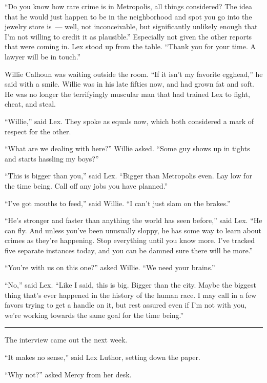 \documentclass[ebook,12pt]{memoir}
\begin{document}
``Do you know how rare crime is in Metropolis, all things considered?
The idea that he would just happen to be in the neighborhood and spot
you go into the jewelry store is~--- well, not inconceivable, but
significantly unlikely enough that I'm not willing to credit it as
plausible.'' Especially not given the other reports that were coming in.
Lex stood up from the table. ``Thank you for your time. A lawyer will be
in touch.''

Willie Calhoun was waiting outside the room. ``If it isn't my favorite
egghead,'' he said with a smile. Willie was in his late fifties now, and
had grown fat and soft. He was no longer the terrifyingly muscular man
that had trained Lex to fight, cheat, and steal.

``Willie,'' said Lex. They spoke as equals now, which both considered a
mark of respect for the other.

``What are we dealing with here?'' Willie asked. ``Some guy shows up in
tights and starts hassling my boys?''

``This is bigger than you,'' said Lex. ``Bigger than Metropolis even.
Lay low for the time being. Call off any jobs you have planned.''

``I've got mouths to feed,'' said Willie. ``I can't just slam on the
brakes.''

``He's stronger and faster than anything the world has seen before,''
said Lex. ``He can fly. And unless you've been unusually sloppy, he has
some way to learn about crimes as they're happening. Stop everything
until you know more. I've tracked five separate instances today, and you
can be damned sure there will be more.''

``You're with us on this one?'' asked Willie. ``We need your brains.''

``No,'' said Lex. ``Like I said, this is big. Bigger than the city.
Maybe the biggest thing that's ever happened in the history of the human
race. I may call in a few favors trying to get a handle on it, but rest
assured even if I'm not with you, we're working towards the same goal
for the time being.''

\begin{center}\rule{0.5\linewidth}{0.5pt}\end{center}

The interview came out the next week.

``It makes no sense,'' said Lex Luthor, setting down the paper.

``Why not?'' asked Mercy from her desk.
\end{document}
